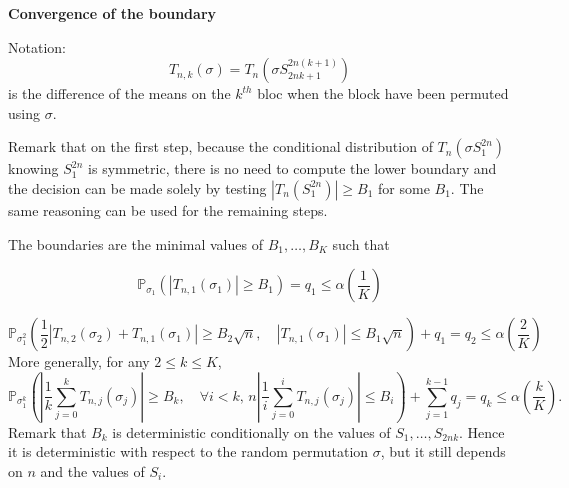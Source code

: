 \documentclass{article}
\theoremstyle{plain}
\theoremstyle{remark}
\renewcommand{\P}{\mathbb{P}}
\newcommand{\1}{\mathbbm{1}}
\numberwithin{equation}{section}
\begin{document}
\textbf{Convergence of the boundary}

Notation:
$$T_{n,k}(\sigma)=T_n\left(\sigma S_{2nk+1}^{2n(k+1)}\right) $$
is the difference of the means on the $k^{th}$ bloc when the block have been permuted using $\sigma$.

Remark that on the first step, because the conditional distribution of $T_n(\sigma S_1^{2n})$ knowing $S_1^{2n}$ is symmetric, there is no need to compute the lower boundary and the decision can be made solely by testing $|T_n(S_1^{2n})|\ge B_1$ for some $B_1$. The same reasoning can be used for the remaining steps.

The boundaries are the minimal values of $B_1,\dots, B_K$ such that

$$\P_{\sigma_1}(|T_{n,1}(\sigma_1)|\ge B_1) = q_1 \le \alpha\left(\frac{1}{K}\right) $$

$$\P_{\sigma_1^2}\left( \frac{1}{2}|T_{n,2}(\sigma_2)+T_{n,1}(\sigma_1)|\ge  B_2\sqrt{n},\quad  |T_{n,1}(\sigma_1)|\le  B_1\sqrt{n}  \right)+q_1 = q_2 \le\alpha\left(\frac{2}{K}\right) $$
More generally, for any $2\le k\le K$,
\begin{equation}\label{eq:def_Bk}
\P_{\sigma_1^k}\left(\left|\frac{1}{k}\sum_{j=0}^k T_{n,j}(\sigma_j)\right|\ge B_{k}, \quad \forall i < k,\,  n\left|\frac{1}{i}\sum_{j=0}^i T_{n,j}\left(\sigma_j\right)\right|\le  B_i\right)+\sum_{j=1}^{k-1}q_j  = q_k \le\alpha\left(\frac{k}{K}\right).
\end{equation}
Remark that $B_k$ is deterministic conditionally on the values of $S_1,\dots,S_{2nk}$. Hence it is deterministic with respect to the random permutation $\sigma$, but it still depends on $n$ and the values of $S_i$.
\end{document}
